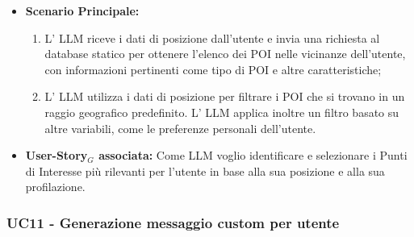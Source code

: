 \documentclass[11pt]{article}
\begin{document}
\begin{justify}
\begin{itemize}
    \item \textbf{Scenario Principale:} 
        \begin{enumerate}
        \item L' LLM riceve i dati di posizione dall'utente e invia una richiesta al database statico per ottenere l'elenco dei POI nelle vicinanze dell'utente, con informazioni pertinenti come tipo di POI e altre caratteristiche;
        \item L' LLM utilizza i dati di posizione per filtrare i POI che si trovano in un raggio geografico predefinito. L' LLM applica inoltre un filtro basato su altre variabili, come le preferenze personali dell'utente.
        \end{enumerate}
    \item \textbf{User-Story$_G$ associata:} Come LLM voglio identificare e selezionare i Punti di Interesse più rilevanti per l'utente in base alla sua posizione e alla sua profilazione.
\end{itemize}


\subsubsection{\textbf{UC11 - Generazione messaggio custom per utente}}


\end{justify}
\end{document}
